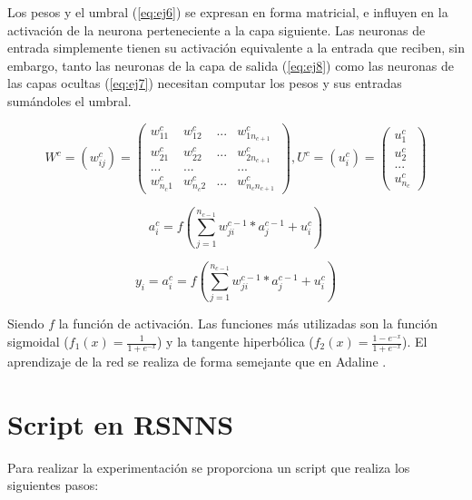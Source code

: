 \documentclass[11pt,spanish,listoffigures,listoftables]{workluis}
\begin{document}
\par Los pesos y el umbral (\ref{eq:ej6}) se expresan en forma matricial, e influyen en la activación de la neurona perteneciente a la capa siguiente. Las neuronas de entrada simplemente tienen su activación equivalente a la entrada que reciben, sin embargo, tanto las neuronas de la capa de salida (\ref{eq:ej8}) como las neuronas de las capas ocultas (\ref{eq:ej7}) necesitan computar los pesos y sus entradas sumándoles el umbral.

\begin{equation}\label{eq:ej6}
W^c = (w_{ij}^c) = \begin{pmatrix}
w_{11}^c & w_{12}^c & ... & w_{1n_{c+1}}^c\\ 
w_{21}^c & w_{22}^c & ... & w_{2n_{c+1}}^c\\ 
... & ... & & ...\\ 
w_{n_{c}1}^c & w_{n_{c}2}^c & ... & w_{n_{c}n_{c+1}}^c 
\end{pmatrix}  ,  U^c = (u_{i}^c) = \begin{pmatrix}
u_{1}^c\\ 
u_{2}^c\\ 
...\\ 
u_{n_{c}}^c 
\end{pmatrix}
\end{equation}

\begin{equation}\label{eq:ej7}
a_{i}^c = f(\sum_{j=1}^{n_{c-1}}w_{ji}^{c-1}*a_{j}^{c-1} + u_{i}^{c})
\end{equation} 

\begin{equation}\label{eq:ej8}
y_{i} = a_{i}^c = f(\sum_{j=1}^{n_{c-1}}w_{ji}^{c-1}*a_{j}^{c-1} + u_{i}^{c})
\end{equation} 

\par Siendo $f$ la función de activación. Las funciones más utilizadas son la función sigmoidal ($f_{1}(x) = \frac{1}{1+e^{-x}}$) y la tangente hiperbólica ($f_{2}(x) = \frac{1-e^{-x}}{1+e^{-x}}$). El aprendizaje de la red se realiza de forma semejante que en Adaline \cite{MLP}.

\section{Script en RSNNS}

\par Para realizar la experimentación se proporciona un script que realiza los siguientes pasos:
\end{document}
